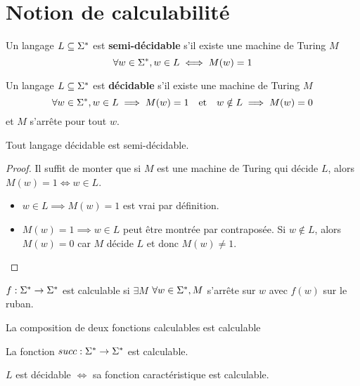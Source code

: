 \section{Notion de calculabilité}


\begin{definition}
	Un langage $L \subseteq \Sigma^{*}$ est \textbf{semi-décidable} s'il existe une machine de Turing $M$ \tlq
	$$ \forall w \in \Sigma^{*}, w \in L \iff M(w) = 1 $$
\end{definition}

\begin{definition}
	Un langage $L \subseteq \Sigma^{*}$ est \textbf{décidable} s'il existe une machine de Turing $M$ \tlq
	$$ \forall w \in \Sigma^{*}, w \in L \implies M(w) = 1 \quad \text{et} \quad w \notin L \implies M(w) = 0 $$
	et $M$ s'arrête pour tout $w$.
\end{definition}

\begin{prop}
	Tout langage décidable est semi-décidable.
\end{prop}

\begin{proof}
	Il suffit de monter que si $M$ est une machine de Turing qui décide $L$, alors $M(w) = 1 \iff w \in L$.
	\begin{itemize}
		\item $w \in L \implies M(w) = 1$ est vrai par définition.
		\item $M(w) = 1 \implies w \in L$ peut être montrée par contraposée. Si $w \notin L$, alors $M(w) = 0$ car $M$ décide $L$ et donc $M(w) \neq 1$.
	\end{itemize}
\end{proof}

\begin{definition}
	$f : \Sigma^{*} \to \Sigma^{*}$ est calculable si $\exists M$ \tq $\forall w \in \Sigma^{*}, M$ s'arrête sur $w$ avec $f(w)$ sur le ruban.
\end{definition}

\begin{lemma}
	La composition de deux fonctions calculables est calculable
\end{lemma}

\begin{lemma}
	La fonction $succ : \Sigma^{*} \to \Sigma^{*}$ est calculable.
\end{lemma}

\begin{prop}
	$L$ est décidable $\iff$ sa fonction caractéristique est calculable.
\end{prop}

